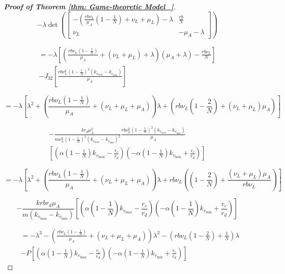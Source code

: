 \documentclass{article}
\theoremstyle{remark}
\theoremstyle{custom} %
\begin{document}
\begin{proof}[\textbf{Proof of Theorem \ref{thm: Game-theoretic Model_}}]
$$
-\lambda \operatorname{det}\left(\left[\begin{array}{cc}
-\left(\frac{r b \nu_L}{\mu_A}\left(1-\frac{1}{{N}}\right)+\nu_L+\mu_L\right)-\lambda & \frac{r b}{{N}} \\
\nu_L & -\mu_A-\lambda
\end{array}\right]\right)
$$

$$
\begin{array}{r}
=-\lambda \left[\left(\frac{r b \nu_L \left(1-\frac{1}{N}\right)}{\mu_A}+\left(\nu_L+\mu_L\right)+\lambda\right)\left(\mu_A+\lambda\right)-\frac{r b \nu_L}{N}\right]  \\
-J_{32} \left[\frac{r b \nu_L^2 \left(1-\frac{1}{N}\right)^2\left(k_{v_{\max }}-k_{v_{\min }}\right)}{\mu_A}\right]
\end{array}
$$

$$
=-\lambda \left[\lambda^2+\left(\frac{r b \nu_L \left(1-\frac{1}{N}\right)}{\mu_A}+\left(\nu_L+\mu_L+\mu_A\right)\right) \lambda+\left(r  b \nu_L \left(1-\frac{2}{N}\right)+\left(\nu_L+\mu_L\right) \mu_A\right)\right]
$$

$$
\begin{aligned}
-\frac{k r_d \mu_A^2}{m \nu_L^2\left(1-\frac{1}{N}\right)^2\left(k_{v_{\max }}-k_{v_{\min }}\right)^2} \frac{r b \nu_L^2 \left(1-\frac{1}{N}\right)^2\left(k_{v_{\max }}-k_{v_{\min }}\right)}{\mu_A} \\
\left[\left(\alpha \left(1-\frac{1}{N}\right) k_{v_{\max }}-\frac{r_c}{r_d}\right)\left(-\alpha \left(1-\frac{1}{N}\right) k_{v_{\min }}+\frac{r_c}{r_d}\right)\right]
\end{aligned}
$$

$$
=-\lambda \left[\lambda^2+\left(\frac{r b \nu_L \left(1-\frac{1}{N}\right)}{\mu_A}+\left(\nu_L+\mu_L+\mu_A\right)\right) \lambda+r b \nu_L \left(\left(1-\frac{2}{N}\right)+\frac{\left(\nu_L+\mu_L\right) \mu_A}{r b \nu_L}\right)\right]
$$

$$
-\frac{k r b r_d \mu_A}{m \left(k_{v_{\max }}-k_{v_{\min }}\right)} \left[\left(\alpha \left(1-\frac{1}{N}\right) k_{v_{\max }}-\frac{r_c}{r_d}\right)\left(-\alpha \left(1-\frac{1}{N}\right) k_{v_{\min }}+\frac{r_c}{r_d}\right)\right]
$$

$$
\begin{aligned}
& =-\lambda^3-\left(\frac{r b \nu_L \left(1-\frac{1}{N}\right)}{\mu_A}+\left(\nu_L+\mu_L+\mu_A\right)\right) \lambda^2-\left(r b \nu_L \left(1-\frac{2}{N}\right)+\frac{1}{N}\right) \lambda \\
& -P \left[\left(\alpha \left(1-\frac{1}{N}\right) k_{v_{\max }}-\frac{r_c}{r_d}\right)\left(-\alpha \left(1-\frac{1}{N}\right) k_{v_{\min }}+\frac{r_c}{r_d}\right)\right]
\end{aligned}
$$


\end{proof}
\end{document}
